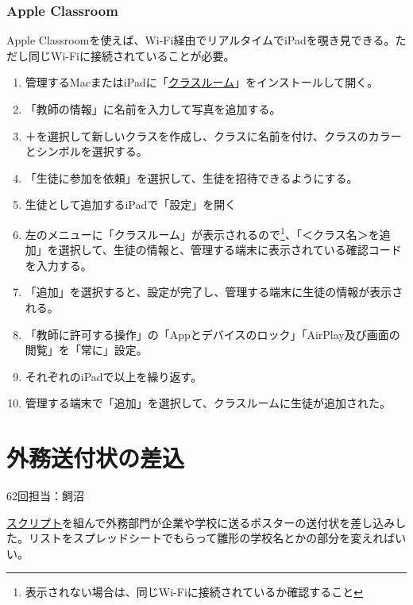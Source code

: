 \documentclass[dvipdfmx,jb5]{jarticle}
\newcommand{\link}[2]{\href{#2}{#1}}
\begin{document}
  \subsubsection{Apple Classroom}
  Apple Classroomを使えば、Wi-Fi経由でリアルタイムでiPadを覗き見できる。ただし同じWi-Fiに接続されていることが必要。
  \begin{enumerate}[手順1.]
   \item 管理するMacまたはiPadに「\link{クラスルーム}{https://apple.co/3DShnKU}」をインストールして開く。
   \item 「教師の情報」に名前を入力して写真を追加する。
   \item ＋を選択して新しいクラスを作成し、クラスに名前を付け、クラスのカラーとシンボルを選択する。
   \item 「生徒に参加を依頼」を選択して、生徒を招待できるようにする。
   \item 生徒として追加するiPadで「設定」を開く
   \item 左のメニューに「クラスルーム」が表示されるので\footnote{表示されない場合は、同じWi-Fiに接続されているか確認すること}、「＜クラス名＞を追加」を選択して、生徒の情報と、管理する端末に表示されている確認コードを入力する。
   \item 「追加」を選択すると、設定が完了し、管理する端末に生徒の情報が表示される。
   \item 「教師に許可する操作」の「Appとデバイスのロック」「AirPlay及び画面の閲覧」を「常に」設定。
   \item それぞれのiPadで以上を繰り返す。
   \item 管理する端末で「追加」を選択して、クラスルームに生徒が追加された。
  \end{enumerate}

\section{外務送付状の差込}\label{sec:外務送付状の差込}
62回担当：飼沼

\href{https://script.google.com/d/1peO_Bmf9jcnJWGCZMN2IRhBrCqokkgPmUVuC4BlryH9kxAiHoXzkjO_x/edit?usp=sharing}{スクリプト}を組んで外務部門が企業や学校に送るポスターの送付状を差し込みした。リストをスプレッドシートでもらって雛形の学校名とかの部分を変えればいい。
\end{document}
